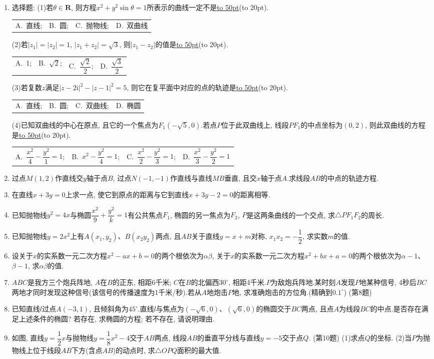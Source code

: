 \documentclass[10pt,a4paper]{article}
\newcommand{\blank}[1]{\underline{\hbox to #1pt{}}}
\newcommand{\bracket}[1]{(\hbox to #1pt{})}
\newcommand{\fourch}[4]{\par\begin{tabular}{p{.23\textwidth}p{.23\textwidth}p{.23\textwidth}p{.23\textwidth}}
A.~#1 &B.~#2& C.~#3& D.~#4
\end{tabular}}
\begin{document}
\begin{enumerate}[1.]
(1)已知$A(-2,-1)$、$B(2,5)$两点.若直线$3x+ay-6=0$过线段$AB$的中点, 则实数$a$的值等于\blank{50}.
(2)点$A$是圆$C$: $x^2+y^2+ax+4y-5=0$上一点.若点$A$关于直线$x+2y-1=0$的对称点也在圆$C$上, 则实数$a=$\blank{50}.
(3)若点$P$在圆$x^2+y^2+4x-6y+12=0$上, 点$Q$在直线$4x+3y-21=0$上, 则$|PQ|$的最小值为\blank{50}.
(4)已知双曲线的中心为原点, 两条渐近线方程是$y=\pm \dfrac 23x$.若这条双曲线过点$M(\dfrac 92,-1)$, 则这条双曲线的焦距为\blank{50}.
(5)若抛物线$x^2=y$上的点到直线$y=2x+b$的最短距离为$\sqrt 5$, 则实数$b=$\blank{50}.
\item 选择题:
(1)若$\theta \in \mathbf{R}$, 则方程$x^2+y^2\sin \theta =1$所表示的曲线一定不是\blank{50}\bracket{20}.
\fourch{直线;}{圆;}{抛物线;}{双曲线}
(2)若$|z_1|=|z_2|=1$, $|z_1+z_2|=\sqrt 3$, 则$|z_1-z_2|$的值是\blank{50}\bracket{20}.
\fourch{1;}{$\sqrt 2$;}{$\dfrac{\sqrt 2}2$;}{$\dfrac{\sqrt 3}2$}
(3)若复数$z$满足$|z-2\mathrm{i}|^2-|z-1|^2=5$, 则它在复平面中对应的点的轨迹是\blank{50}\bracket{20}.
\fourch{直线;}{圆;}{双曲线;}{椭圆}
(4)已知双曲线的中心在原点, 且它的一个焦点为$F_1(-\sqrt 5,0)$.若点$P$位于此双曲线上, 线段$PF_1$的中点坐标为$(0,2)$, 则此双曲线的方程是\blank{50}\bracket{20}.
\fourch{$\dfrac{x^2}4-\dfrac{y^2}1=1$;}{$x^2-\dfrac{y^2}4=1$;}{$\dfrac{x^2}2-\dfrac{y^2}3=1$;}{$\dfrac{x^2}3-\dfrac{y^2}2=1$}
\item 过点$M(1,2)$作直线交$y$轴于点$B$, 过点$N(-1,-1)$作直线与直线$MB$垂直, 且交$x$轴于点$A$.求线段$AB$的中点的轨迹方程.
\item 在直线$x+3y=0$上求一点, 使它到原点的距离与它到直线$x+3y-2=0$的距离相等.
\item 已知抛物线$y^2=4x$与椭圆$\dfrac{x^2}9+\dfrac{y^2}k=1$有公共焦点$F_1$, 椭圆的另一焦点为$F_2$, $P$是这两条曲线的一个交点, 求$\triangle PF_1F_2$的周长.
\item 已知抛物线$y=2x^2$上有$A(x_1,y_2)$、$B(x_2y_2)$两点, 且$AB$关于直线$y=x+m$对称, $x_1x_2=-\dfrac 12$, 求实数$m$的值.
\item 设关于$x$的实系数一元二次方程$x^2-ax+b=0$的两个根依次为$\alpha \beta$, 关于$x$的实系数一元二次方程$x^2+bx+a=0$的两个根依次为$\alpha -1$、$\beta -1$, 求$\alpha \beta$的值.
\item $ABC$是我方三个炮兵阵地, $A$在$B$的正东, 相距6千米; $C$在$B$的北偏西$30^{\circ }$, 相距4千米.$P$为敌炮兵阵地.某时刻$A$发现$P$地某种信号, 4秒后$BC$两地才同时发现这种信号(该信号的传播速度为1千米/秒).若从$A$地炮击$P$地, 求准确炮击的方位角.(精确到$0.1^{\circ }$)
(第8题)
\item 已知直线$l$过点$A(-3,1)$, 且倾斜角为$45^{\circ }$.直线$l$与焦点为$(-\sqrt 6,0)$、$(\sqrt 6,0)$的椭圆交于$BC$两点, 且点$A$为线段$BC$的中点.是否存在满足上述条件的椭圆? 若存在, 求椭圆的方程; 若不存在, 请说明理由.
\item 如图, 直线$y=\dfrac 12x$与抛物线$y=\dfrac 18x^2-4$交于$AB$两点, 线段$AB$的垂直平分线与直线$y=-5$交于点$Q$.
(第10题)
(1)求点$Q$的坐标.
(2)当$P$为抛物线上位于线段$AB$下方(含点$AB$)的动点时, 求$\triangle OPQ$面积的最大值.





\end{enumerate}
\end{document}
